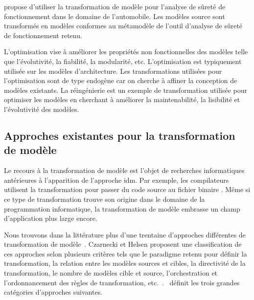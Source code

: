 \cite{biehl2010integrating} propose d'utiliser la transformation de modèle pour 
l'analyse de sûreté de fonctionnement dans le domaine de l'automobile. Les 
modèles source sont transformés en modèles conformes au métamodèle de l'outil 
d'analyse de sûreté de fonctionnement retenu.
 
L'optimisation vise à améliorer les propriétés non fonctionnelles des modèles 
telle que l'évolutivité, la fiabilité, la modularité, etc. L'optimisation est 
typiquement utilisée sur les modèles d'architecture. Les transformations 
utilisées pour l'optimisation sont de type endogène car on cherche à affiner 
la conception de modèles existants. La réingénierie est un exemple de 
transformation utilisée pour optimiser les modèles en cherchant à améliorer la 
maintenabilité, la lisibilité et l'évolutivité des modèles.


\subsection{Approches existantes pour la transformation de modèle}  
Le recours à la transformation de modèle est l'objet de recherches informatiques 
antérieures à l'apparition de l'approche \gls{idm}. Par exemple, les compilateurs 
utilisent la transformation pour passer du code source au fichier binaire 
\cite{aho1985compilers}. Même si ce type de transformation trouve son origine dans le domaine de 
la programmation informatique, la transformation de modèle embrasse un champ d'application 
plus large encore.

Nous trouvons dans la littérature plus d'une trentaine d'approches différentes 
de transformation de modèle~\cite{syriani2011multi}. Czarnecki et Helsen 
proposent une classification de ces approches selon plusieurs critères tels que 
le paradigme retenu pour définir la transformation, la relation entre les 
modèles sources et cibles, la directivité de la transformation, le nombre de 
modèles cible et source, l'orchestration et l'ordonnancement des règles de 
transformation, etc.~\cite{czarnecki2006feature}.~\cite{blanc2011mda} définit les trois grandes catégories d'approches suivantes.

